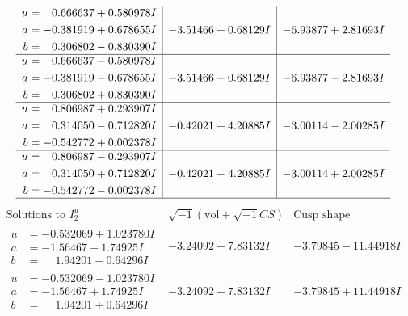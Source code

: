 \documentclass[1p]{elsarticle_modified}
\theoremstyle{definition}
\newcommand{\I}{\sqrt{-1}}
\begin{document}
$$\begin{array}{c|c|c}
\begin{aligned}
u &= \phantom{-}0.666637 + 0.580978 I \\
a &= -0.381919 + 0.678655 I \\
b &= \phantom{-}0.306802 - 0.830390 I\end{aligned}
 & -3.51466 + 0.68129 I & -6.93877 + 2.81693 I \\ \hline\begin{aligned}
u &= \phantom{-}0.666637 - 0.580978 I \\
a &= -0.381919 - 0.678655 I \\
b &= \phantom{-}0.306802 + 0.830390 I\end{aligned}
 & -3.51466 - 0.68129 I & -6.93877 - 2.81693 I \\ \hline\begin{aligned}
u &= \phantom{-}0.806987 + 0.293907 I \\
a &= \phantom{-}0.314050 - 0.712820 I \\
b &= -0.542772 + 0.002378 I\end{aligned}
 & -0.42021 + 4.20885 I & -3.00114 - 2.00285 I \\ \hline\begin{aligned}
u &= \phantom{-}0.806987 - 0.293907 I \\
a &= \phantom{-}0.314050 + 0.712820 I \\
b &= -0.542772 - 0.002378 I\end{aligned}
 & -0.42021 - 4.20885 I & -3.00114 + 2.00285 I\\
 \hline 
 \end{array}$$\newpage$$\begin{array}{c|c|c}  
\text{Solutions to }I^u_{2}& \I (\text{vol} + \sqrt{-1}CS) & \text{Cusp shape}\\
 \hline 
\begin{aligned}
u &= -0.532069 + 1.023780 I \\
a &= -1.56467 - 1.74925 I \\
b &= \phantom{-}1.94201 - 0.64296 I\end{aligned}
 & -3.24092 + 7.83132 I & -3.79845 - 11.44918 I \\ \hline\begin{aligned}
u &= -0.532069 - 1.023780 I \\
a &= -1.56467 + 1.74925 I \\
b &= \phantom{-}1.94201 + 0.64296 I\end{aligned}
 & -3.24092 - 7.83132 I & -3.79845 + 11.44918 I \\ \hline\begin{aligned}

\end{aligned}
\end{array}$$
\end{document}
